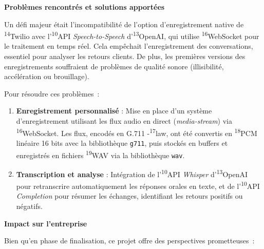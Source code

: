 \textbf{Problèmes rencontrés et solutions apportées}\vspace{0.3cm}

Un défi majeur était l’incompatibilité de l’option d’enregistrement native de \textsuperscript{14}Twilio avec l’\textsuperscript{10}API \textit{Speech-to-Speech} d’\textsuperscript{13}OpenAI, qui utilise \textsuperscript{16}WebSocket pour le traitement en temps réel. Cela empêchait l’enregistrement des conversations, essentiel pour analyser les retours clients. De plus, les premières versions des enregistrements souffraient de problèmes de qualité sonore (illisibilité, accélération ou brouillage).\vspace{0.3cm}

Pour résoudre ces problèmes~:

\begin{enumerate}
    \item \textbf{Enregistrement personnalisé} : Mise en place d’un système d’enregistrement utilisant les flux audio en direct (\textit{media-stream}) via \textsuperscript{16}WebSocket. Les flux, encodés en G.711 \textmu-\textsuperscript{17}law, ont été convertis en \textsuperscript{18}PCM linéaire 16 bits avec la bibliothèque \texttt{g711}, puis stockés en buffers et enregistrés en fichiers \textsuperscript{19}WAV via la bibliothèque \texttt{wav}.\vspace{0.3cm}
    \item \textbf{Transcription et analyse} : Intégration de l’\textsuperscript{10}API \textit{Whisper} d’\textsuperscript{13}OpenAI pour retranscrire automatiquement les réponses orales en texte, et de l’\textsuperscript{10}API \textit{Completion} pour résumer les échanges, identifiant les retours positifs ou négatifs.\vspace{0.3cm}
\end{enumerate}

\textbf{Impact sur l’entreprise}\vspace{0.3cm}

Bien qu’en phase de finalisation, ce projet offre des perspectives prometteuses~:

